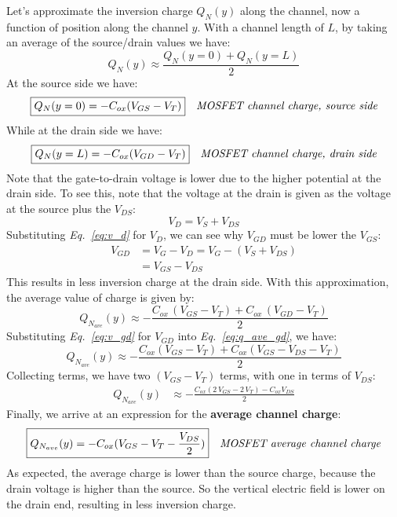 Let's approximate the inversion charge $Q_N(y)$ along the channel, now a function of position along the channel $y$.  With a channel length of $L$, by taking an average of the source/drain values we have:
    \begin{equation} 
        Q_N(y) \approx \frac{Q_N(y=0) + Q_N(y=L)}{2}
    \end{equation}
At the source side we have:
    \begin{align} 
        \Aboxed{Q_N(y=0) &= -C_{ox}(V_{GS} - V_T)}
        &\textit{MOSFET channel charge, source side}
    \end{align}
While at the drain side we have:
    \begin{align} 
        \Aboxed{Q_N(y=L) &= -C_{ox}(V_{GD} - V_T)}
        &\textit{MOSFET channel charge, drain side}
    \end{align}
Note that the gate-to-drain voltage is lower due to the higher potential at the drain side.  To see this, note that 
the voltage at the drain is given as the voltage at the source plus the $V_{DS}$:
    \begin{equation}
    	V_D = V_S + V_{DS}
    	\label{eq:v_d}
    \end{equation}
Substituting \emph{Eq.~\ref{eq:v_d}} for $V_D$, we can see why $V_{GD}$ must be lower the $V_{GS}$:
    \begin{align}
    	V_{GD} &= V_{G} - V_{D} = V_{G} - (V_S + V_{DS})\\
    	&= V_{GS} - V_{DS}
    	\label{eq:v_gd}
    \end{align}
This results in less inversion charge at the drain side.  With this approximation, the average value of charge is given by:
    \begin{equation}
        Q_{N_{ave}}(y) \approx - \frac{C_{ox}\,(V_{GS} - V_T) + C_{ox}\,(V_{GD} - V_T)}{2}
        \label{eq:q_ave_gd}
    \end{equation}
Substituting \emph{Eq.~\ref{eq:v_gd}} for $V_{GD}$ into \emph{Eq.~\ref{eq:q_ave_gd}}, we have:
    \begin{equation}
        Q_{N_{ave}}(y) \approx -\frac{C_{ox}(V_{GS} - V_T) + C_{ox}(V_{GS} - V_{DS} - V_T)}{2}
    \end{equation}
Collecting terms, we have two $(V_{GS} - V_T)$ terms, with one in terms of $V_{DS}$:
    \begin{align}
        Q_{N_{ave}}(y) &\approx -\frac{C_{ox}(2\,V_{GS} - 2\,V_T) - C_{ox}V_{DS}}{2}
    \end{align}
Finally, we arrive at an expression for the \textbf{average channel charge}:
    \begin{align}
        \Aboxed{Q_{N_{ave}}(y) &= -C_{ox}(V_{GS} - V_T - \frac{V_{DS}}{2})}
        &\textit{MOSFET average channel charge}
    \end{align}
As expected, the average charge is lower than the source charge, because the drain voltage is higher than the source.  So the vertical electric field is lower on the drain end, resulting in less inversion charge.
